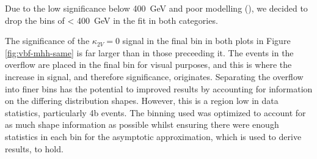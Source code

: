 Due to the low significance below \SI{400}{\GeV} and poor modelling (\Fig{\ref{fig:Control-Region-1all-4b-8}}), we decided to drop the bins of \mhh < \SI{400}{\GeV} in the fit in both categories.

The significance of the $\kappa_{2V} = 0$ signal in the final bin in both plots in Figure \ref{fig:vbf-mhh-same} is far larger than in those preceeding it. The events in the overflow are placed in the final bin for visual purposes, and this is where the increase in signal, and therefore significance, originates. Separating the overflow into finer bins has the potential to improved results by accounting for information on the differing distribution shapes. However, this is a region low in data statistics, particularly 4b events. The binning used was optimized to account for as much shape information as possible whilst ensuring there were enough statistics in each bin for the asymptotic approximation, which is used to derive results, to hold. 


